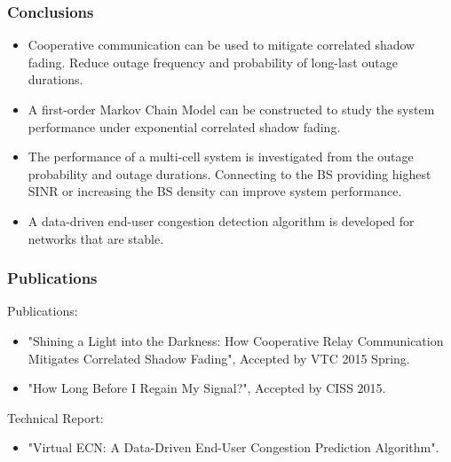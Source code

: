 \documentclass{beamer}
\begin{document}
\begin{frame}
\frametitle{Conclusions}
\begin{itemize}

\item Cooperative communication can be used to mitigate correlated shadow fading. Reduce outage frequency and probability of long-last outage durations. 
\item A first-order Markov Chain Model can be constructed to study the system performance under exponential correlated shadow fading.
\item The performance of a multi-cell system is investigated from the outage probability and outage durations. Connecting to the BS providing highest SINR or increasing the BS density can improve system performance.
\item A data-driven end-user congestion detection algorithm is developed for networks that are stable.
\end{itemize}
\end{frame}
\begin{frame}
\frametitle{Publications}
Publications:
\begin{itemize}
\item "Shining a Light into the Darkness: How Cooperative Relay Communication Mitigates Correlated Shadow Fading", Accepted by VTC 2015 Spring.
\item "How Long Before I Regain My Signal?", Accepted by CISS 2015.
\end{itemize}
Technical Report:
\begin{itemize}
\item "Virtual ECN: A Data-Driven End-User Congestion Prediction Algorithm".
\end{itemize}
\end{frame}
\end{document}

